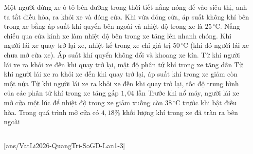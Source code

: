 	\begin{ex}%
		Một người dừng xe ô tô bên đường trong thời tiết nắng nóng để vào siêu thị, anh ta tắt điều hòa, ra khỏi xe và đóng cửa. Khi vừa đóng cửa, áp suất không khí bên trong xe bằng áp suất khí quyển bên ngoài và nhiệt độ trong xe là $25\,^\circ\text{C}$. Nắng chiếu qua cửa kính xe làm nhiệt độ bên trong xe tăng lên nhanh chóng. Khi người lái xe quay trở lại xe, nhiệt kế trong xe chỉ giá trị $50\,^\circ\text{C}$ (khi đó người lái xe chưa mở cửa xe). Áp suất khí quyển không đổi và khoang xe kín.
		\choiceTFt
		{Từ khi người lái xe ra khỏi xe đến khi quay trở lại, mật độ phân tử khí trong xe tăng dần}
		{Từ khi người lái xe ra khỏi xe đến khi quay trở lại, áp suất khí trong xe giảm còn một nửa}
		{\True Từ khi người lái xe ra khỏi xe đến khi quay trở lại, tốc độ trung bình của các phân tử khí trong xe tăng gấp $1{,}04$ lần}
		{\True Trước khi nổ máy, người lái xe mở cửa một lúc để nhiệt độ trong xe giảm xuống còn $38\,^\circ\text{C}$ trước khi bật điều hòa. Trong quá trình mở cửa có $4{,}18\%$ khối lượng khí trong xe đã tràn ra bên ngoài}
	\end{ex}

	\subsection*{}
	\setcounter{ex}{0}
	[ans/VatLi2026-QuangTri-SoGD-Lan1-3]

